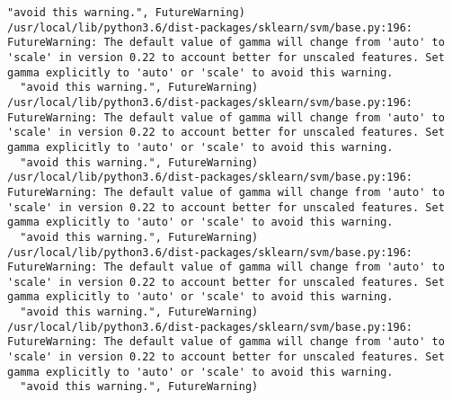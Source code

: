 \documentclass[11pt]{article}
\begin{document}
\begin{Verbatim}[commandchars=\\\{\}]
  "avoid this warning.", FutureWarning)
/usr/local/lib/python3.6/dist-packages/sklearn/svm/base.py:196: FutureWarning: The default value of gamma will change from 'auto' to 'scale' in version 0.22 to account better for unscaled features. Set gamma explicitly to 'auto' or 'scale' to avoid this warning.
  "avoid this warning.", FutureWarning)
/usr/local/lib/python3.6/dist-packages/sklearn/svm/base.py:196: FutureWarning: The default value of gamma will change from 'auto' to 'scale' in version 0.22 to account better for unscaled features. Set gamma explicitly to 'auto' or 'scale' to avoid this warning.
  "avoid this warning.", FutureWarning)
/usr/local/lib/python3.6/dist-packages/sklearn/svm/base.py:196: FutureWarning: The default value of gamma will change from 'auto' to 'scale' in version 0.22 to account better for unscaled features. Set gamma explicitly to 'auto' or 'scale' to avoid this warning.
  "avoid this warning.", FutureWarning)
/usr/local/lib/python3.6/dist-packages/sklearn/svm/base.py:196: FutureWarning: The default value of gamma will change from 'auto' to 'scale' in version 0.22 to account better for unscaled features. Set gamma explicitly to 'auto' or 'scale' to avoid this warning.
  "avoid this warning.", FutureWarning)
/usr/local/lib/python3.6/dist-packages/sklearn/svm/base.py:196: FutureWarning: The default value of gamma will change from 'auto' to 'scale' in version 0.22 to account better for unscaled features. Set gamma explicitly to 'auto' or 'scale' to avoid this warning.
  "avoid this warning.", FutureWarning)

    \end{Verbatim}
\end{document}
